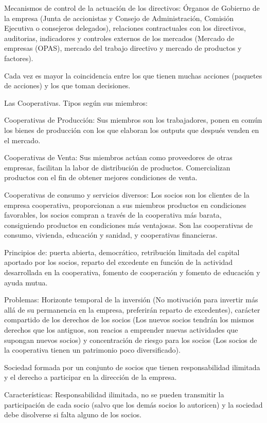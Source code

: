 \documentclass[12pt, twoside, openright]{report} %
\begin{document}
Mecanismos de control de la actuación de los directivos: Órganos de Gobierno de la empresa (Junta de
accionistas y Consejo de Administración, Comisión Ejecutiva o consejeros delegados), relaciones
contractuales con los directivos, auditorias, indicadores y controles externos de los mercados (Mercado de
empresas (OPAS), mercado del trabajo directivo y mercado de productos y factores).

Cada vez es mayor la coincidencia entre los que tienen muchas acciones (paquetes de acciones) y los que
toman decisiones.

Las Cooperativas. Tipos según sus miembros:

Cooperativas de Producción: Sus miembros son los trabajadores, ponen en común los bienes de producción
con los que elaboran los outputs que después venden en el mercado.

Cooperativas de Venta: Sus miembros actúan como proveedores de otras empresas, facilitan la labor de
distribución de productos. Comercializan productos con el fin de obtener mejores condiciones de venta.

Cooperativas de consumo y servicios diversos: Los socios son los clientes de la empresa cooperativa,
proporcionan a sus miembros productos en condiciones favorables, los socios compran a través de la
cooperativa más barata, consiguiendo productos en condiciones más ventajosas. Son las cooperativas de
consumo, vivienda, educación y sanidad, y cooperativas financieras.

Principios de: puerta abierta, democrático, retribución limitada del capital aportado por los socios, reparto
del excedente en función de la actividad desarrollada en la cooperativa, fomento de cooperación y fomento
de educación y ayuda mutua.

Problemas: Horizonte temporal de la inversión (No motivación para invertir más allá de su permanencia en
la empresa, preferirán reparto de excedentes), carácter compartido de los derechos de los socios (Los nuevos
socios tendrán los mismos derechos que los antiguos, son reacios a emprender nuevas actividades que
supongan nuevos socios) y concentración de riesgo para los socios (Los socios de la cooperativa tienen un
patrimonio poco diversificado).

Sociedad formada por un conjunto de socios que tienen responsabilidad ilimitada y el derecho a participar
en la dirección de la empresa.

Características: Responsabilidad ilimitada, no se pueden transmitir la participación de cada socio (salvo que
los demás socios lo autoricen) y la sociedad debe disolverse si falta alguno de los socios.
\end{document}
